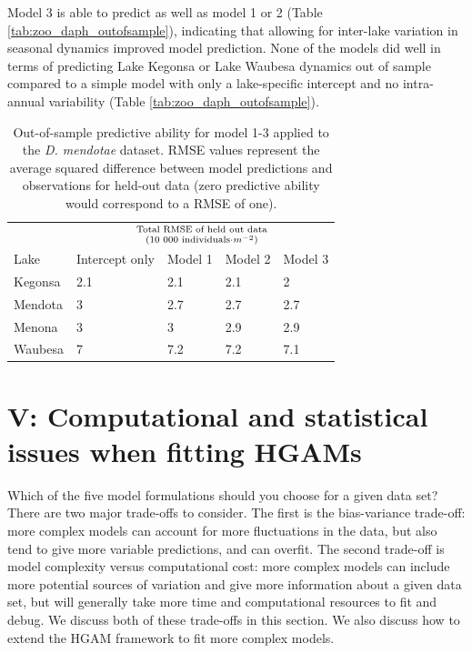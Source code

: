 \documentclass[12pt]{article}
\begin{document}
Model 3 is able to predict as well as model 1 or 2 (Table
\ref{tab:zoo_daph_outofsample}), indicating that allowing for inter-lake
variation in seasonal dynamics improved model prediction. None of the
models did well in terms of predicting Lake Kegonsa or Lake Waubesa
dynamics out of sample compared to a simple model with only a
lake-specific intercept and no intra-annual variability (Table
\ref{tab:zoo_daph_outofsample}).

\begin{table}

\caption{\label{tab:zoo_daph_outofsample_kable}Out-of-sample predictive ability for model 1-3 applied to the \textit{D. mendotae} dataset. RMSE values represent the average squared difference between model predictions and observations for held-out data (zero predictive ability would correspond to a RMSE of one).}
\centering
\begin{tabular}[t]{lllll}
\toprule
\multicolumn{1}{c}{ } & \multicolumn{4}{c}{\Large{${\text{Total RMSE of held out data}}\atop{(\text{10 000 individuals}\cdot m^{-2})}$}} \\
\cmidrule(l{2pt}r{2pt}){2-5}
Lake & Intercept only & Model 1 & Model 2 & Model 3\\
\midrule
Kegonsa & 2.1 & 2.1 & 2.1 & 2\\
Mendota & 3 & 2.7 & 2.7 & 2.7\\
Menona & 3 & 3 & 2.9 & 2.9\\
Waubesa & 7 & 7.2 & 7.2 & 7.1\\
\bottomrule
\end{tabular}
\end{table}

\FloatBarrier

\section{V: Computational and statistical issues when fitting
HGAMs}\label{v-computational-and-statistical-issues-when-fitting-hgams}

Which of the five model formulations should you choose for a given data
set? There are two major trade-offs to consider. The first is the
bias-variance trade-off: more complex models can account for more
fluctuations in the data, but also tend to give more variable
predictions, and can overfit. The second trade-off is model complexity
versus computational cost: more complex models can include more
potential sources of variation and give more information about a given
data set, but will generally take more time and computational resources
to fit and debug. We discuss both of these trade-offs in this section.
We also discuss how to extend the HGAM framework to fit more complex
models.
\end{document}
